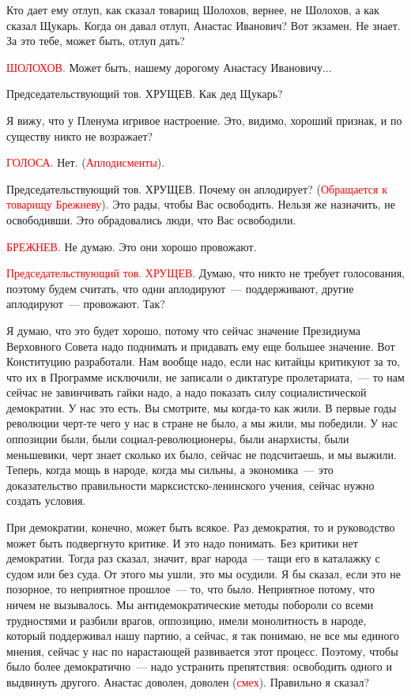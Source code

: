 \documentclass{kursa4}
\begin{document}
{    {Кто дает ему отлуп, как сказал товарищ Шолохов,
    вернее, не Шолохов, а как сказал Щукарь. Когда он давал отлуп, Анастас
    Иванович? Вот экзамен. Не знает. За это тебе, может быть, отлуп дать?}

    \textcolor{red}{ШОЛОХОВ.}{
    Может быть, нашему дорогому Анастасу Ивановичу...}

    {Председательствующий тов. ХРУЩЕВ. Как дед Щукарь?}

    {Я вижу, что у Пленума игривое настроение. Это, видимо,
    хороший признак, и по существу никто не возражает?}

    \textcolor{red}{ГОЛОСА.}{
    Нет.
    (}\textcolor{red}{Аплодисменты}{).}

    {Председательствующий тов. ХРУЩЕВ. Почему он
    аплодирует? (}\textcolor{red}{Обращается к
    товарищу Брежневу}{). Это рады, чтобы Вас освободить.
    Нельзя же назначить, не освободивши. Это обрадовались люди, что Вас
    освободили.}

    \textcolor{red}{БРЕЖНЕВ.}{
    Не думаю. Это они хорошо провожают.}

    \textcolor{red}{Председательствующий тов.
    ХРУЩЕВ.}{ Думаю, что никто не требует голосования,
    поэтому будем считать, что одни аплодируют~--- поддерживают, другие
    аплодируют~--- провожают. Так?}

    {Я думаю, что это будет хорошо, потому что сейчас
    значение Президиума Верховного Совета надо поднимать и придавать ему
    еще большее значение. Вот Конституцию разработали. Нам вообще надо,
    если нас китайцы критикуют за то, что их в Программе исключили, не
    записали о диктатуре пролетариата,~--- то нам сейчас не завинчивать гайки
    надо, а надо показать силу социалистической демократии. У нас это есть.
    Вы смотрите, мы когда-то как жили. В первые годы революции черт-те чего
    у нас в стране не было, а мы жили, мы победили. У нас оппозиции были,
    были социал-революционеры, были анархисты, были меньшевики, черт знает
    сколько их было, сейчас не подсчитаешь, и мы выжили. Теперь, когда мощь
    в народе, }{когда мы сильны, а экономика~--- это
    доказательство правильности марксистско-ленинского учения, сейчас нужно
    создать условия.}

    {При демократии, конечно, может быть всякое. Раз
    демократия, то и руководство может быть подвергнуто критике. И это надо
    понимать. Без критики нет демократии. Тогда раз сказал, значит, враг
    народа~--- тащи его в каталажку с судом или без суда. От этого мы ушли,
    это мы осудили. Я бы сказал, если это не позорное, то неприятное
    прошлое~--- то, что было. Неприятное потому, что ничем не вызывалось. Мы
    антидемократические методы побороли со всеми трудностями и разбили
    врагов, оппозицию, имели монолитность в народе, который поддерживал
    нашу партию, а сейчас, я так понимаю, не все мы единого мнения, сейчас
    у нас по нарастающей развивается этот процесс. Поэтому, чтобы было
    более демократично~--- надо устранить препятствия: освободить одного и
    выдвинуть другого. Анастас доволен, доволен
    (}\textcolor{red}{смех}{).
    Правильно я сказал?}

}
\end{document}

